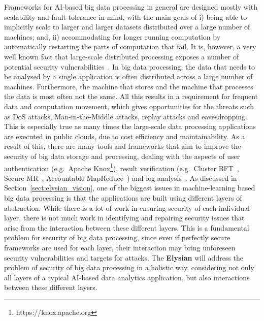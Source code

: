 \documentclass[a4paper,11pt]{article}
\newcommand{\project}[1]{\textbf{#1}\xspace}
\newcommand{\SECURITY}{\project{Elysian}}
\newcommand{\TheProject}{\SECURITY}
\begin{document}
Frameworks for AI-based big data processing in general are designed mostly with scalability and fault-tolerance in mind, with the main goals of i) being able to implicitly scale to larger and larger datasets distributed over a large number of machines; and, ii) accommodating for longer running computation by automatically restarting the parts of computation that fail. It is, however, a very well known fact that large-scale distributed processing exposes a number of potential security vulnerabilities~\cite{bigdatasecurity}. In big data processing, the data that needs to be analysed by a single application is often distributed across a large number of machines. Furthermore, the machine that stores and the machine that processes the data is most often not the same. All this results in a requirement for frequent data and computation movement, which gives opportunities for the threats such as DoS attacks, Man-in-the-Middle attacks, replay attacks and eavesdropping. This is especially true as many times the large-scale data processing applications are executed in public clouds, due to cost efficiency and maintainability. As a result of this, there are many tools and frameworks that aim to improve the security of big data storage and processing, dealing with the aspects of user authentication (e.g.~Apache Knox\footnote{https://knox.apache.org}), result verification (e.g.~Cluster BFT~\cite{bft}, Secure MR~\cite{securemr}, Accountable MapReduce~\cite{accountablemr}) and log analysis~\cite{loganalysis}. 
%
As discussed in Section~\ref{sect:elysian_vision}, one of the biggest issues in machine-learning based big data processing is that the applications are built using different layers of abstraction. While there is a lot of work in ensuring security of each individual layer, there is not much work in identifying and repairing security issues that arise from the interaction between these different layers. This is a fundamental problem for security of big data processing, since even if perfectly secure frameworks are used for each layer, their interaction may bring unforeseen security vulnerabilities and targets for attacks. The \TheProject{} will address the problem of security of big data processing in a holistic way, considering not only all layers of a typical AI-based data analytics application, but also interactions between these different layers.
\end{document}
